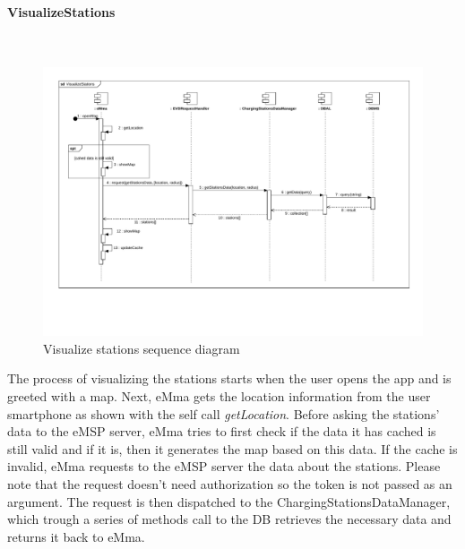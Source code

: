 \paragraph{VisualizeStations}\mbox{}\\
\begin{figure}[H]
    \centering
    \includegraphics[trim={0 3cm 0 1cm},clip, width=1\textwidth]{Images/cp2/runtime/VisualizeStations.pdf}
    \caption{Visualize stations sequence diagram}
\end{figure}
The process of visualizing the stations starts when the user opens the app and is greeted with a map. Next, eMma gets the location information from the user smartphone as shown with the self call \textit{getLocation}. Before asking the stations' data to the eMSP server, eMma tries to first check if the data it has cached is still valid and if it is, then it generates the map based on this data. If the cache is invalid, eMma requests to the eMSP server the data about the stations. Please note that the request doesn't need authorization so the token is not passed as an argument. The request is then dispatched to the ChargingStationsDataManager, which trough a series of methods call to the DB retrieves the necessary data and returns it back  to eMma.

